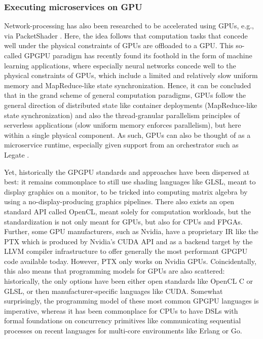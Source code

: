 \documentclass{IEEEtran}
\begin{document}
\subsubsection{Executing microservices on GPU}

Network-processing has also been researched to be accelerated using \glspl{GPU}, e.g., via PacketShader \cite{han2010packetshader}. Here, the idea follows that computation tasks that concede well under the physical constraints of \glspl{GPU} are offloaded to a \gls{GPU}. This so-called \gls{GPGPU} paradigm has recently found its foothold in the form of machine learning applications, where especially neural networks concede well to the physical constraints of \glspl{GPU}, which include a limited and relatively slow uniform memory and MapReduce-like state synchronization. Hence, it can be concluded that in the grand scheme of general computation paradigms, \glspl{GPU} follow the general direction of distributed state like container deployments (MapReduce-like state synchronization) and also the thread-granular parallelism principles of serverless applications (slow uniform memory enforces parallelism), but here within a single physical component. As such, \glspl{GPU} can also be thought of as a microservice runtime, especially given support from an orchestrator such as Legate \cite{bauer2019legate}.

Yet, historically the \gls{GPGPU} standards and approaches have been dispersed at best: it remains commonplace to still use shading languages like \gls{GLSL}, meant to display graphics on a monitor, to be tricked into computing matrix algebra by using a no-display-producing graphics pipelines. There also exists an open standard \gls{API} called OpenCL, meant solely for computation workloads, but the standardization is not only meant for GPUs, but also for CPUs and FPGAs. Further, some \gls{GPU} manufacturers, such as Nvidia, have a proprietary \gls{IR} like the \gls{PTX} which is produced by Nvidia's \gls{CUDA} \gls{API} and as a backend target by the \gls{LLVM} compiler infrastructure to offer generally the most performant \gls{GPGPU} code available today. However, \gls{PTX} only works on Nvidia \glspl{GPU}. Coincidentally, this also means that programming models for \glspl{GPU} are also scattered: historically, the only options have been either open standards like OpenCL C or \gls{GLSL}, or then manufacturer-specific languages like \gls{CUDA}. Somewhat surprisingly, the programming model of these most common \gls{GPGPU} languages is imperative, whereas it has been commonplace for CPUs to have \glspl{DSL} with formal foundations on concurrency primitives like communicating sequential processes \cite{hoare1978communicating} on recent languages for multi-core environments like Erlang or Go.
\end{document}
